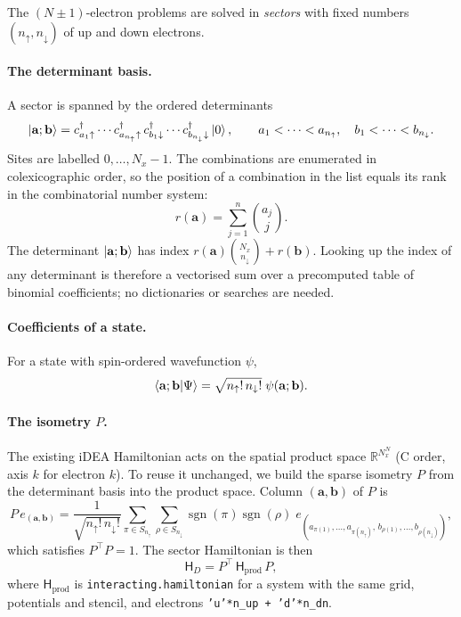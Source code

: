 \documentclass[11pt,a4paper]{article}
\newcommand{\iDEA}{iDEA}
\newcommand{\code}[1]{\texttt{#1}}
\newcommand{\mat}[1]{\mathsf{#1}}
\newcommand{\sgn}{\operatorname{sgn}}
\newcommand{\Nx}{N_x}
\newcommand{\up}{{\uparrow}}
\newcommand{\dn}{{\downarrow}}
\begin{document}
The $(N\pm1)$-electron problems are solved in \emph{sectors} with fixed numbers $(n_\up,n_\dn)$ of up and down electrons.

\paragraph{The determinant basis.} A sector is spanned by the ordered determinants
\begin{equation}
\ket{\mathbf a;\mathbf b} = c^\dagger_{a_1\up}\cdots c^\dagger_{a_{n_\up}\up}\,c^\dagger_{b_1\dn}\cdots c^\dagger_{b_{n_\dn}\dn}\ket{0}, \qquad a_1<\dots<a_{n_\up},\quad b_1<\dots<b_{n_\dn}.
\end{equation}
Sites are labelled $0,\dots,\Nx-1$. The combinations are enumerated in colexicographic order, so the position of a combination in the list equals its rank in the combinatorial number system:
\begin{equation}
r(\mathbf a) = \sum_{j=1}^{n}\binom{a_j}{j}.
\label{eq:rank}
\end{equation}
The determinant $\ket{\mathbf a;\mathbf b}$ has index $r(\mathbf a)\binom{\Nx}{n_\dn} + r(\mathbf b)$. Looking up the index of any determinant is therefore a vectorised sum over a precomputed table of binomial coefficients; no dictionaries or searches are needed.

\paragraph{Coefficients of a state.} For a state with spin-ordered wavefunction $\psi$,
\begin{equation}
\braket{\mathbf a;\mathbf b|\Psi} = \sqrt{n_\up!\,n_\dn!}\;\psi(\mathbf a;\mathbf b).
\end{equation}

\paragraph{The isometry $P$.} The existing \iDEA{} Hamiltonian acts on the spatial product space $\mathbb{R}^{\Nx^N}$ (C order, axis $k$ for electron $k$). To reuse it unchanged, we build the sparse isometry $P$ from the determinant basis into the product space. Column $(\mathbf a,\mathbf b)$ of $P$ is
\begin{equation}
P\,e_{(\mathbf a,\mathbf b)} = \frac{1}{\sqrt{n_\up!\,n_\dn!}}\sum_{\pi\in S_{n_\up}}\sum_{\rho\in S_{n_\dn}}\sgn(\pi)\sgn(\rho)\;e_{(a_{\pi(1)},\dots,a_{\pi(n_\up)},\,b_{\rho(1)},\dots,b_{\rho(n_\dn)})},
\end{equation}
which satisfies $P^\top P = 1$. The sector Hamiltonian is then
\begin{equation}
\mat H_D = P^\top\,\mat H_\text{prod}\,P,
\end{equation}
where $\mat H_\text{prod}$ is \code{interacting.hamiltonian} for a system with the same grid, potentials and stencil, and electrons \code{'u'*n\_up + 'd'*n\_dn}.
\end{document}
